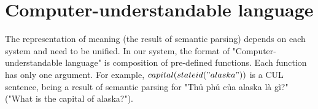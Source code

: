 \section{Computer-understandable language}
\label{sec:c-u}

The representation of meaning (the result of semantic parsing) depends on each system and need to be unified. In our system, the format of "Computer-understandable language" is composition of pre-defined functions. Each function has only one argument. For example, $capital(stateid("alaska"))$ is a CUL sentence, being a result of semantic parsing for "Thủ phủ của alaska là gì?" ("What is the capital of alaska?"). 